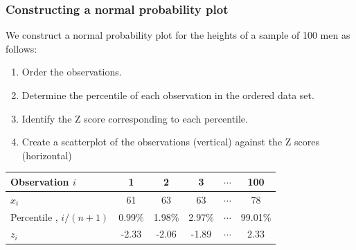 \documentclass[11pt,containsverbatim,handout,xcolor=xelatex,dvipsnames,table]{beamer}
\begin{document}

\begin{frame}
\frametitle{Constructing a normal probability plot}

We construct a normal probability plot for the heights of a sample of 100 men as follows:

\begin{enumerate}

\item Order the observations.

\item Determine the percentile of each observation in the ordered data set.

\item Identify the Z score corresponding to each percentile.

\item Create a scatterplot of the observations (vertical) against the Z scores (horizontal)

\end{enumerate}

\pause

\begin{center}
\begin{tabular}{l | c | c | c | c | c}
Observation $i$	& 1		& 2		& 3		& $\cdots$	& 100 \\
\hline
$x_i$			& 61		& 63		& 63		& $\cdots$	& 78 \\
Percentile	, $i / (n+1)$& 0.99\% 	& 1.98\% 	& 2.97\% 	& $\cdots$	& 99.01\% \\
$z_i$			& -2.33	& -2.06 	& -1.89	& $\cdots$	& 2.33
\end{tabular}
\end{center}

\pause


\end{frame}

\end{document}
